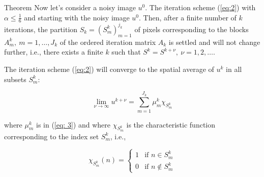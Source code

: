 \documentclass{beamer}
\begin{document}
\begin{frame}[plain]
  \begin{block}{Theorem}
    Now let's consider a noisy image $u^0$. The iteration scheme (\ref{eq:2}) with $\alpha \leq \frac{1}{6}$ and starting with the noisy image $u^0$. Then, after a finite number of $k$ iterations, the partition $S_k = (S_{m}^{k})^{j_k}_{m=1}$ of pixels corresponding to the blocks $A_{m}^{k},\ m = 1, \ldots, J_k$ of the ordered iteration matrix $A_k$ is settled and will not change further, i.e., there exists a finite $k$ such that $S^k = S^{k+\nu},\ \nu = 1, 2, \ldots$.

The iteration scheme (\ref{eq:2}) will converge to the spatial average of $u^k$ in all subsets $S^k_m$:

\[
\lim_{{\nu \to \infty}} u^{k+\nu} =  \sum_{{m=1}}^{{J_k}} \mu^{k}_m \chi_{S^k_m}
\]

where $ \mu^{k}_m$ is in (\ref{eq: 3}) and where $\chi_{S^k_m}$ is the characteristic function corresponding to the index set $S^k_m$, i.e.,

\[
\chi_{S^k_m}(n) =
\begin{cases}
	1 & \text{if } n \in S_{m}^{k} \\
	0 & \text{if } n \notin S_{m}^{k}
\end{cases}
\]
    \end{block}


\end{frame}
\end{document}
